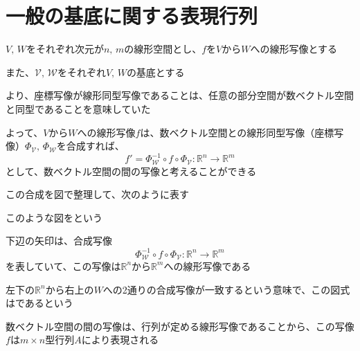 \documentclass[../../../topic_linear-algebra]{subfiles}
\begin{document}
\sectionline
\section{一般の基底に関する表現行列}

$V,\,W$をそれぞれ次元が$n,\,m$の線形空間とし、$f$を$V$から$W$への線形写像とする

また、$\mathcal{V}, \, \mathcal{W}$をそれぞれ$V,\,W$の基底とする

\br

より、座標写像が線形同型写像であることは、任意の部分空間が数ベクトル空間と同型であることを意味していた

よって、$V$から$W$への線形写像$f$は、数ベクトル空間との線形同型写像（座標写像）$\Phi_\mathcal{V}, \, \Phi_\mathcal{W}$を合成すれば、
\begin{equation*}
  f' = \Phi_\mathcal{W}^{-1} \circ f \circ \Phi_\mathcal{V} : \mathbb{R}^n \to \mathbb{R}^m
\end{equation*}
として、数ベクトル空間の間の写像と考えることができる

\br

この合成を図で整理して、次のように表す

\begin{center}
\end{center}

このような図をという

\br

下辺の矢印は、合成写像
\begin{equation*}
  \Phi^{-1}_{\mathcal{W}} \circ f \circ \Phi_{\mathcal{V}} : \mathbb{R}^n \to \mathbb{R}^m
\end{equation*}
を表していて、この写像は$\mathbb{R}^n$から$\mathbb{R}^m$への線形写像である

\br

左下の$\mathbb{R}^n$から右上の$W$への2通りの合成写像が一致するという意味で、この図式はであるという

\sectionline

数ベクトル空間の間の写像は、行列が定める線形写像であることから、この写像$f$は$m \times n$型行列$A$により表現される
\end{document}
